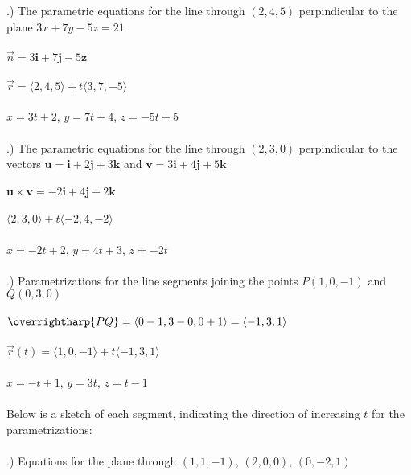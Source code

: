\documentclass[12pt]{article}
\begin{document}
.) The parametric equations for the line through $(2, 4, 5)$ perpindicular  to the plane $3x + 7y -5z = 21$ \\\\
\noindent $\vec{n} = 3\mathbf{i} + 7\mathbf{j} -5\mathbf{z}$\\\\
\noindent $\vec{r} = \langle 2, 4, 5\rangle + t \langle 3, 7, -5\rangle$\\\\
\noindent $x = 3t +2$, \hspace{10pt} $y = 7t + 4$, \hspace{10pt} $z = -5t +5$\\\\
.) The parametric equations for the line through $(2, 3, 0)$ perpindicular to the vectors 
$\mathbf{u} = \mathbf{i} + 2\mathbf{j} + 3\mathbf{k}$ and $\mathbf{v} = 3\mathbf{i} + 4\mathbf{j} + 5\mathbf{k}$ \\\\
\noindent $\mathbf{u \times v} = -2\mathbf{i} + 4\mathbf{j} -2\mathbf{k}$\\\\
\noindent $\langle 2, 3, 0\rangle + t\langle -2, 4, -2\rangle$\\\\
\noindent $x = -2t + 2$, \hspace{10pt} $y = 4t + 3$, \hspace{10pt} $z = -2t$\\\\
.) Parametrizations for the line segments joining the points $P(1, 0, -1)$ and $Q(0, 3, 0)$ \\\\
\noindent $\overrightharp{PQ} = \langle 0-1, 3-0, 0+1\rangle = \langle -1, 3, 1\rangle$\\\\
\noindent $\vec{r}(t) = \langle 1, 0, -1\rangle + t\langle -1, 3, 1\rangle$\\\\
\noindent $x = -t + 1$, \hspace{10pt} $y = 3t$, \hspace{10pt} $z = t - 1$\\\\
Below is a sketch of each segment, indicating the direction of increasing $t$ for the parametrizations: \\\\
.) Equations for the plane through $(1, 1, -1)$, \hspace{10pt} $(2, 0, 0)$, \hspace{10pt} $(0, -2, 1)$\\\\
\end{document}
